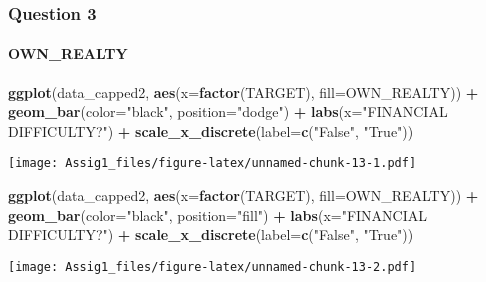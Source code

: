 \documentclass[
]{article}
\newenvironment{Shaded}{\begin{snugshade}}{\end{snugshade}}
\newcommand{\AttributeTok}[1]{\textcolor[rgb]{0.13,0.29,0.53}{#1}}
\newcommand{\FunctionTok}[1]{\textcolor[rgb]{0.13,0.29,0.53}{\textbf{#1}}}
\newcommand{\NormalTok}[1]{#1}
\newcommand{\SpecialCharTok}[1]{\textcolor[rgb]{0.81,0.36,0.00}{\textbf{#1}}}
\newcommand{\StringTok}[1]{\textcolor[rgb]{0.31,0.60,0.02}{#1}}
\begin{document}
\hypertarget{question-3}{%
\subsubsection{Question 3}\label{question-3}}

\hypertarget{own_realty}{%
\paragraph{OWN\_REALTY}\label{own_realty}}

\begin{Shaded}
\begin{Highlighting}[]
\FunctionTok{ggplot}\NormalTok{(data\_capped2, }\FunctionTok{aes}\NormalTok{(}\AttributeTok{x=}\FunctionTok{factor}\NormalTok{(TARGET), }\AttributeTok{fill=}\NormalTok{OWN\_REALTY)) }\SpecialCharTok{+}
  \FunctionTok{geom\_bar}\NormalTok{(}\AttributeTok{color=}\StringTok{"black"}\NormalTok{, }\AttributeTok{position=}\StringTok{"dodge"}\NormalTok{) }\SpecialCharTok{+}
  \FunctionTok{labs}\NormalTok{(}\AttributeTok{x=}\StringTok{"FINANCIAL DIFFICULTY?"}\NormalTok{) }\SpecialCharTok{+}
  \FunctionTok{scale\_x\_discrete}\NormalTok{(}\AttributeTok{label=}\FunctionTok{c}\NormalTok{(}\StringTok{"False"}\NormalTok{, }\StringTok{"True"}\NormalTok{))}
\end{Highlighting}
\end{Shaded}

\texttt{[image: Assig1\_files/figure-latex/unnamed-chunk-13-1.pdf]}

\begin{Shaded}
\begin{Highlighting}[]
\FunctionTok{ggplot}\NormalTok{(data\_capped2, }\FunctionTok{aes}\NormalTok{(}\AttributeTok{x=}\FunctionTok{factor}\NormalTok{(TARGET), }\AttributeTok{fill=}\NormalTok{OWN\_REALTY)) }\SpecialCharTok{+}
  \FunctionTok{geom\_bar}\NormalTok{(}\AttributeTok{color=}\StringTok{"black"}\NormalTok{, }\AttributeTok{position=}\StringTok{"fill"}\NormalTok{) }\SpecialCharTok{+}
  \FunctionTok{labs}\NormalTok{(}\AttributeTok{x=}\StringTok{"FINANCIAL DIFFICULTY?"}\NormalTok{) }\SpecialCharTok{+}
  \FunctionTok{scale\_x\_discrete}\NormalTok{(}\AttributeTok{label=}\FunctionTok{c}\NormalTok{(}\StringTok{"False"}\NormalTok{, }\StringTok{"True"}\NormalTok{))}
\end{Highlighting}
\end{Shaded}

\texttt{[image: Assig1\_files/figure-latex/unnamed-chunk-13-2.pdf]}
\end{document}
